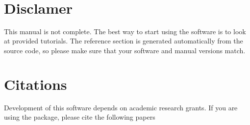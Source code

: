 \begin{titlepage}


\vspace*{1cm}

\vspace*{3cm}
\vspace*{1cm}

\vfill
\center{\large{\today}} \\
\end{titlepage}

\section*{Disclamer}
This manual is not complete. The best way to start using the software is to look at provided tutorials. The reference section is generated automatically from the source code, so please make sure that your software and manual versions match.  

\section*{Citations}
Development of this software depends on academic research grants. If you are using the package, please cite the  following papers \\

